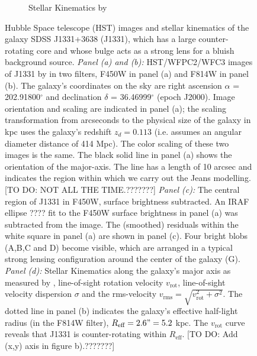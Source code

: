 \begin{figure}
\begin{subfigure}{.5\textwidth}
  \caption{Stellar Kinematics by \citet{SWELLSV}}
  \label{fig:kinematics}
\end{subfigure}
\caption{Hubble Space telescope (HST) images and stellar kinematics of the galaxy SDSS J1331+3638 (J1331), which has a large counter-rotating core and whose bulge acts as a strong lens for a bluish background source. \emph{Panel (a) and (b):} HST/WFPC2/WFC3 images of J1331 by \citet{SWELLSI} in two filters, F450W in panel (a) and F814W in panel (b). The galaxy's coordinates on the sky are right ascension $\alpha$ = 202.91800$^\circ$ and declination $\delta$ = 36.46999$^\circ$ (epoch J2000). Image orientation and scaling are indicated in panel (a); the scaling transformation from arcseconds to the physical size of the galaxy in kpc uses the galaxy's redshift $z_d = 0.113$ \citep{SWELLSIII} (i.e. assumes an angular diameter distance of 414 Mpc). The color scaling of these two images is the same. The black solid line in panel (a) shows the orientation of the major-axis. The line has a length of 10 arcsec and indicates the region within which we carry out the Jeans modelling. [TO DO: NOT ALL THE TIME.???????] \emph{Panel (c):} The central region of J1331 in F450W, surface brightness subtracted. An IRAF ellipse ???? fit to the F450W surface brightness in panel (a) was subtracted from the image. The (smoothed) residuals within the white square in panel (a) are shown in panel (c). Four bright blobs (A,B,C and D) become visible, which are arranged in a typical strong lensing configuration around the center of the galaxy (G). \emph{Panel (d):} Stellar Kinematics along the galaxy's major axis as measured by \citet{SWELLSV}, line-of-sight rotation velocity $v_\text{rot}$, line-of-sight velocity dispersion $\sigma$ and the rms-velocity $v_\text{rms} = \sqrt{v_\text{rot}^2 + \sigma^2}$. The dotted line in panel (b) indicates the galaxy's effective half-light radius (in the F814W filter), $R_\text{eff} = 2.6" = 5.2$ kpc. The $v_\text{rot}$ curve reveals that J1331 is counter-rotating within $R_\text{eff}$. [TO DO: Add (x,y) axis in figure b).???????]}
\label{fig:specialJ1331}
\end{figure}

\clearpage
